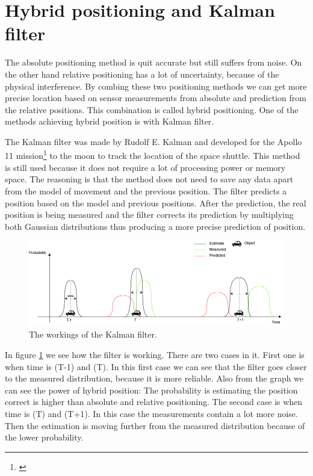 \section{Hybrid positioning and Kalman filter}

The absolute positioning method is quit accurate but still suffers from noise. On the other hand relative positioning has a lot of uncertainty, because of the physical interference. By combing these two positioning methods we can get more precise location based on sensor measurements from absolute and prediction from the relative positions. This combination is called hybrid positioning. One of the methods achieving hybrid position is with Kalman filter.

The Kalman filter was made by Rudolf E. Kalman and developed for the Apollo 11 mission\footnote{\cite{Grewal2010}} to the moon to track the location of the space shuttle. This method is still used because it does not require a lot of processing power or memory space. The reasoning is that the method does not need to save any data apart from the model of movement and the previous position. The filter predicts a position based on the model and previous positions. After the prediction, the real position is being measured and the filter corrects its prediction by multiplying both Gaussian distributions thus producing a more precise prediction of position.

\begin{figure}[H]
	\centering
	\includegraphics[width=0.7\linewidth]{positioning/positioning/DiagramKalman}
	\caption{The workings of the Kalman filter.}
	\label{fig:Kalmanfilter}
\end{figure}

In figure \ref{fig:Kalmanfilter} we see how the filter is working. There are two cases in it. First one is when time is (T-1) and (T). In this first case we can see that the filter goes closer to the measured distribution, because it is more reliable. Also from the graph we can see the power of hybrid position: The probability is estimating the position correct is higher than absolute and relative positioning. The second case is when time is (T) and (T+1). In this case the measurements contain a lot more noise. Then the estimation is moving further from the measured distribution because of the lower probability.